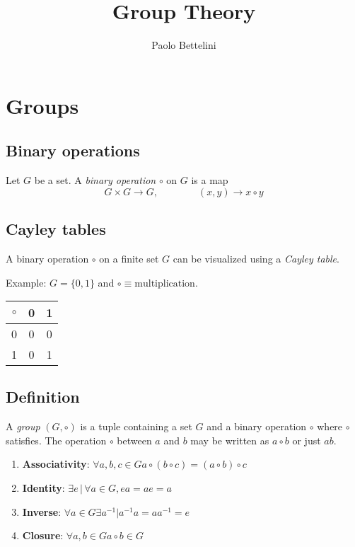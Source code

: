 \documentclass[a4paper]{article}
\title{Group Theory}
\author{Paolo Bettelini}
\date{}
\begin{document}
\maketitle
\tableofcontents
\pagebreak

\section{Groups}

\subsection{Binary operations}

Let \(G\) be a set. A \textit{binary operation} \(\circ\) on \(G\) is a map
\[
    G \times G \to G,
    \quad\quad\quad\quad
    (x,y) \to x \circ y
\]


\subsection{Cayley tables}

A binary operation \(\circ\) on a finite set \(G\) can be
visualized using a \textit{Cayley table}.

Example: \(G=\{0,1\}\) and \(\circ \equiv \text{multiplication}\).
\begin{tabular}{|c|c|c|}
    \hline
    \(\circ\) & 0 & 1 \\
    \hline
    0 & 0 & 0 \\
    \hline
    1 & 0 & 1 \\
    \hline
\end{tabular}

\subsection{Definition}

A \textit{group} \((G,\circ)\) is a tuple containing a set \(G\) and
a binary operation \(\circ\) where \(\circ\) satisfies.
The operation \(\circ\) between \(a\) and \(b\) may be written as
\(a\circ b\) or just \(ab\).

\begin{enumerate}
    \item \textbf{Associativity}: \(\forall a,b,c\in G a \circ (b \circ c) = (a \circ b) \circ c\)
    \item \textbf{Identity}: \(\exists e \,|\, \forall a \in G, ea=ae=a\) 
    \item \textbf{Inverse}: \(\forall a\in G \exists a^{-1} | a^{-1}a = aa^{-1} = e\)
    \item \textbf{Closure}: \(\forall a,b\in G a \circ b \in G\)
\end{enumerate}
\end{document}
